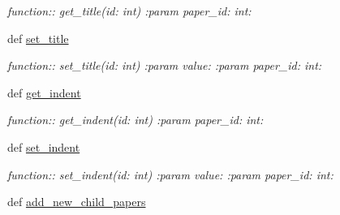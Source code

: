 \begin{DoxyCompactItemize}
\begin{DoxyCompactList}\small\item\em function\+:\+: get\+\_\+title(id\+: int) \+:param paper\+\_\+id\+: int\+: \end{DoxyCompactList}\item 
def \hyperlink{classplume-creator_1_1src_1_1plume_1_1data_1_1tree_1_1tree_1_1_tree_ae1b4a1aa1125b3799821de4e3524a8af}{set\+\_\+title}\hypertarget{classplume-creator_1_1src_1_1plume_1_1data_1_1tree_1_1tree_1_1_tree_ae1b4a1aa1125b3799821de4e3524a8af}{}\label{classplume-creator_1_1src_1_1plume_1_1data_1_1tree_1_1tree_1_1_tree_ae1b4a1aa1125b3799821de4e3524a8af}

\begin{DoxyCompactList}\small\item\em function\+:\+: set\+\_\+title(id\+: int) \+:param value\+: \+:param paper\+\_\+id\+: int\+: \end{DoxyCompactList}\item 
def \hyperlink{classplume-creator_1_1src_1_1plume_1_1data_1_1tree_1_1tree_1_1_tree_a7fe298ca1740c6a461a0111fdc2bdcd7}{get\+\_\+indent}\hypertarget{classplume-creator_1_1src_1_1plume_1_1data_1_1tree_1_1tree_1_1_tree_a7fe298ca1740c6a461a0111fdc2bdcd7}{}\label{classplume-creator_1_1src_1_1plume_1_1data_1_1tree_1_1tree_1_1_tree_a7fe298ca1740c6a461a0111fdc2bdcd7}

\begin{DoxyCompactList}\small\item\em function\+:\+: get\+\_\+indent(id\+: int) \+:param paper\+\_\+id\+: int\+: \end{DoxyCompactList}\item 
def \hyperlink{classplume-creator_1_1src_1_1plume_1_1data_1_1tree_1_1tree_1_1_tree_a8738682db4f0f9d841fc4017104e7608}{set\+\_\+indent}\hypertarget{classplume-creator_1_1src_1_1plume_1_1data_1_1tree_1_1tree_1_1_tree_a8738682db4f0f9d841fc4017104e7608}{}\label{classplume-creator_1_1src_1_1plume_1_1data_1_1tree_1_1tree_1_1_tree_a8738682db4f0f9d841fc4017104e7608}

\begin{DoxyCompactList}\small\item\em function\+:\+: set\+\_\+indent(id\+: int) \+:param value\+: \+:param paper\+\_\+id\+: int\+: \end{DoxyCompactList}\item 
def \hyperlink{classplume-creator_1_1src_1_1plume_1_1data_1_1tree_1_1tree_1_1_tree_a117a02ea07854a0940f7d7d1a51a521b}{add\+\_\+new\+\_\+child\+\_\+papers}\hypertarget{classplume-creator_1_1src_1_1plume_1_1data_1_1tree_1_1tree_1_1_tree_a117a02ea07854a0940f7d7d1a51a521b}{}\label{classplume-creator_1_1src_1_1plume_1_1data_1_1tree_1_1tree_1_1_tree_a117a02ea07854a0940f7d7d1a51a521b}


\end{DoxyCompactItemize}
